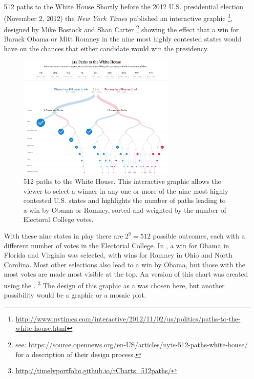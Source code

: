 \documentclass[10pt,krantz2]{krantz}\usepackage[]{graphicx}\usepackage[]{color}
\begin{document}
\begin{Example}[512paths]{512 paths to the White House}
Shortly before the 2012 U.S. presidential election (November 2, 2012)
the \emph{New York Times} published an interactive graphic%
\footnote{\url{http://www.nytimes.com/interactive/2012/11/02/us/politics/paths-to-the-white-house.html}},
designed by Mike Bostock and Shan Carter%
\footnote{
see: \url{https://source.opennews.org/en-US/articles/nyts-512-paths-white-house/}
for a description of their design process.}
showing
the effect that a win for Barack Obama or Mitt Romney in the
nine most highly contested states would have on the chances
that either candidate would win the presidency.

\begin{figure}
\centering
\includegraphics[width=0.7\textwidth]{ch01/fig/nyt_512paths.png}
\caption{512 paths to the White House.  This interactive graphic allows the viewer to
select a winner in any one or more of the nine most highly contested U.S. states
and highlights the number of paths leading to a win by Obama or Romney, sorted and
weighted
by the number of Electoral College votes.}
\label{fig:nyt_512paths}
\end{figure}

With these nine states in play there are $2^9 = 512$ possible outcomes,
each with a different number of votes in the Electorial College.
In , a win for Obama in Florida and Virginia was
selected, with wins for Romney in Ohio and North Carolina.
Most other selections also lead to a win by Obama, but those with
the most votes are made most visible at the top.
An \R version of this chart was created using the .%
\footnote{
\url{http://timelyportfolio.github.io/rCharts_512paths/}
}
The design of this graphic as a  was chosen here, but
another possibility would be a  graphic
\citep{Shneiderman:92} or a mosaic plot.


\end{Example}
\end{document}
